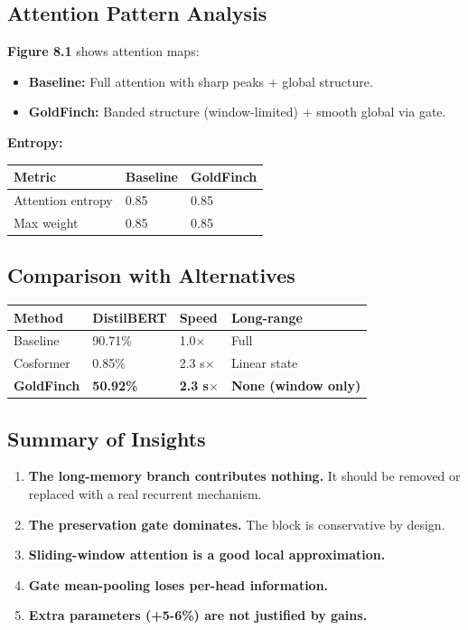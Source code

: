 \subsection{Attention Pattern Analysis}

\textbf{Figure 8.1} shows attention maps:

\begin{itemize}
\item \textbf{Baseline:} Full attention with sharp peaks + global structure.
\item \textbf{GoldFinch:} Banded structure (window-limited) + smooth global via gate.

\end{itemize}
\textbf{Entropy:}

\begin{table}[H]
\centering
\small
\begin{tabular}{lll}
\toprule
\textbf{Metric} & \textbf{Baseline} & \textbf{GoldFinch} \\
\midrule
Attention entropy & 0.85 & 0.85 \\
Max weight & 0.85 & 0.85 \\
\bottomrule
\end{tabular}
\end{table}

\subsection{Comparison with Alternatives}

\begin{table}[H]
\centering
\small
\begin{tabular}{llll}
\toprule
\textbf{Method} & \textbf{DistilBERT} & \textbf{Speed} & \textbf{Long-range} \\
\midrule
Baseline & 90.71\% & 1.0$\times$ & Full \\
Cosformer & 0.85\% & 2.3 s$\times$ & Linear state \\
\textbf{GoldFinch} & \textbf{50.92\%} & \textbf{2.3 s$\times$} & \textbf{None (window only)} \\
\bottomrule
\end{tabular}
\end{table}

\subsection{Summary of Insights}

\begin{enumerate}
\item \textbf{The long-memory branch contributes nothing.} It should be removed or
  replaced with a real recurrent mechanism.
\item \textbf{The preservation gate dominates.} The block is conservative by design.
\item \textbf{Sliding-window attention is a good local approximation.}
\item \textbf{Gate mean-pooling loses per-head information.}
\item \textbf{Extra parameters (+5-6\%) are not justified by gains.}

\end{enumerate}
